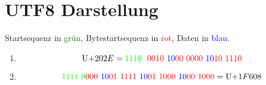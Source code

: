 \documentclass[DIN, pagenumber=false, fontsize=11pt, parskip=half]{scrartcl}
\begin{document}
    \section{UTF8 Darstellung}
    Startsequenz in \textcolor{green}{grün}, Bytestartsequenz in \textcolor{red}{rot}, Daten in \textcolor{blue}{blau}.
    \begin{enumerate}[label=(\alph*)]
        \item
            \begin{equation*}
                \text{U+}202E = \textcolor{green}{1110} \ \textcolor{red}{\ 0010} \  \textcolor{blue}{10} \textcolor{red}{00\ 0000} \ \textcolor{blue}{10} \textcolor{red}{10\ 1110}
            \end{equation*}
        \item
            \begin{equation*}
                \textcolor{green}{1111\ 0} \textcolor{red}{000}\ \textcolor{blue}{10} \textcolor{red}{01\ 1111}\ \textcolor{blue}{10} \textcolor{red}{01\ 1000}\ \textcolor{blue}{10} \textcolor{red}{00\ 1000} = \text{U+}1F608
            \end{equation*}
    \end{enumerate}
\end{document}
